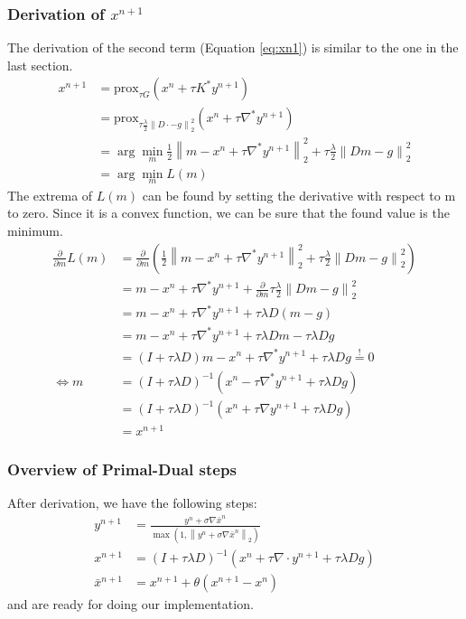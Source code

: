 \documentclass{paper}
\newcommand{\prox}{\text{prox}}
\newcommand{\twonorm}[1]{\left\lVert#1\right\rVert_2}
\begin{document}
\subsubsection*{Derivation of $x^{n+1}$}
The derivation of the second term (Equation \eqref{eq:xn1}) is similar 
to the one in the last section. 
\begin{align}
x^{n+1} &= \prox_{\tau G}(x^n + \tau K^* y^{n+1}) \\
	    &= \prox_{\tau \frac{\lambda}{2}\twonorm{ D\cdot - g}^2}(x^n + \tau \nabla^* y^{n+1}) \\
	    &= \arg \min_m \frac{1}{2} \twonorm{m - x^n + \tau \nabla^* y^{n+1}}^2 + \tau \frac{\lambda}{2}\twonorm{ Dm - g}^2 \\
	    &= \arg \min_m L(m)
\end{align}
The extrema of $L(m)$ can be found by setting the derivative 
with respect to m to zero. Since it is a convex function, we can be sure that the 
found value is the minimum.
\begin{align}
\frac{\partial}{\partial m} L(m) &= \frac{\partial}{\partial m} \left( \frac{1}{2} \twonorm{m - x^n + \tau \nabla^* y^{n+1}}^2 
+ \tau \frac{\lambda}{2}\twonorm{ Dm - g}^2 \right) \\
&= m - x^n + \tau \nabla^* y^{n+1} +
\frac{\partial}{\partial m} \tau \frac{\lambda}{2}\twonorm{Dm - g}^2 \\
&= m - x^n + \tau \nabla^* y^{n+1} +
\tau \lambda D(m - g) \\
&= m - x^n + \tau \nabla^* y^{n+1} +
\tau \lambda Dm - \tau \lambda D g \\
&= (I + \tau \lambda D)m - x^n + \tau \nabla^* y^{n+1} +
\tau \lambda D g \overset{!}{=} 0 \\
\Longleftrightarrow m &= (I + \tau \lambda D)^{-1} 
(x^n - \tau \nabla^* y^{n+1} + \tau \lambda D g)
 \\
&=  (I + \tau \lambda D)^{-1} (x^n + \tau \nabla y^{n+1} + \tau \lambda D g) \\
&= x^{n+1}
\end{align}

\subsubsection*{Overview of Primal-Dual steps}
After derivation, we have the following steps:
\begin{align}
y^{n+1} &= \frac{y^n + \sigma \nabla \bar{x}^n}
				{\max \left( 1, \twonorm{y^n + \sigma \nabla \bar{x}^n} \right)} \\
x^{n+1} &= (I + \tau \lambda D)^{-1} 
           (x^n + \tau \nabla \cdot y^{n+1} + \tau \lambda D g) \\
\bar{x}^{n+1} &= x^{n+1} + \theta(x^{n+1} - x^n)
\end{align}
and are ready for doing our implementation.
\end{document}
